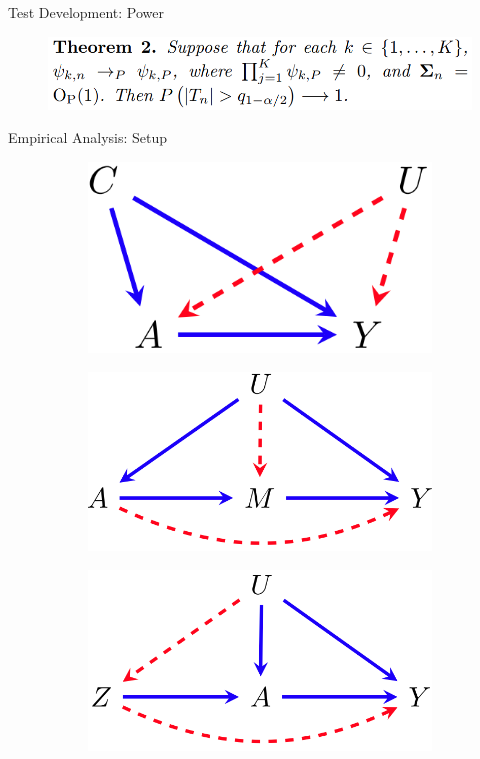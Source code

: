 \documentclass{beamer}
\begin{document}
\begin{frame}{Test Development: Power}
	\begin{figure}
		\center
		\includegraphics[scale=0.2]{theorem2.png}
	\end{figure}
\end{frame}

\begin{frame}{Empirical Analysis: Setup}
	\begin{figure}
		\begin{subfigure}{0.33 \textwidth}
			\center
			\includegraphics[scale=0.15]{m1.png}
		\end{subfigure}%
		\begin{subfigure}{0.33 \textwidth}
			\center
			\includegraphics[scale=0.15]{m2.png}
		\end{subfigure}%
		\begin{subfigure}{0.33 \textwidth}
			\center
			\includegraphics[scale=0.15]{m3.png}

\end{subfigure}
\end{figure}
\end{frame}
\end{document}

